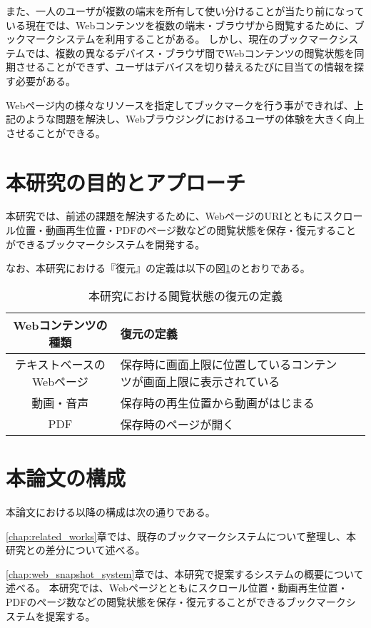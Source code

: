 また、一人のユーザが複数の端末を所有して使い分けることが当たり前になっている現在では、Webコンテンツを複数の端末・ブラウザから閲覧するために、ブックマークシステムを利用することがある。
しかし、現在のブックマークシステムでは、複数の異なるデバイス・ブラウザ間でWebコンテンツの閲覧状態を同期させることができず、ユーザはデバイスを切り替えるたびに目当ての情報を探す必要がある。

Webページ内の様々なリソースを指定してブックマークを行う事ができれば、上記のような問題を解決し、Webブラウジングにおけるユーザの体験を大きく向上させることができる。

\section{本研究の目的とアプローチ}
本研究では、前述の課題を解決するために、WebページのURIとともにスクロール位置・動画再生位置・PDFのページ数などの閲覧状態を保存・復元することができるブックマークシステムを開発する。

なお、本研究における『復元』の定義は以下の図\ref{tb:restore-definition}のとおりである。

\begin{table}[htbp]
  \begin{center}
    \caption{本研究における閲覧状態の復元の定義}
    \label{tb:restore-definition}
    \begin{tabular}{|c|l|l|}
      \hline
      Webコンテンツの種類 & 復元の定義 \\\hline\hline
      テキストベースのWebページ & 保存時に画面上限に位置しているコンテンツが画面上限に表示されている \\\hline
      動画・音声 & 保存時の再生位置から動画がはじまる \\\hline
      PDF & 保存時のページが開く \\\hline
    \end{tabular}
  \end{center}
\end{table}

\section{本論文の構成}

本論文における以降の構成は次の通りである。

\ref{chap:related_works}章では、既存のブックマークシステムについて整理し、本研究との差分について述べる。

\ref{chap:web_snapshot_system}章では、本研究で提案するシステムの概要について述べる。
本研究では、Webページとともにスクロール位置・動画再生位置・PDFのページ数などの閲覧状態を保存・復元することができるブックマークシステムを提案する。

